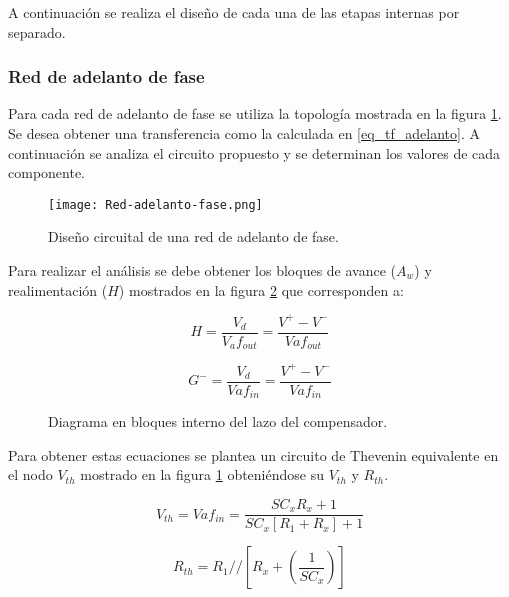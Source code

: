 A continuación se realiza el diseño de cada una de las etapas internas por separado.

\subsubsection{Red de adelanto de fase}

Para cada red de adelanto de fase se utiliza la topología mostrada en la figura \ref{fig:red-adelanto-fase}. Se desea obtener una transferencia como la calculada en \ref{eq_tf_adelanto}. A continuación se analiza el circuito propuesto y se determinan los valores de cada componente. 

\begin{figure}[H]
	\centering
	\texttt{[image: Red-adelanto-fase.png]}
	\caption{Diseño circuital de una red de adelanto de fase.}
	\label{fig:red-adelanto-fase}
\end{figure}

Para realizar el análisis se debe obtener los bloques de avance ($A_w$) y realimentación ($H$) mostrados en la figura \ref{fig:diag-diagrama_lazo_compensador} que corresponden a:


\begin{equation} 
	H = \frac{V_d}{V_af_{out}}=\frac{V^+ - V^-}{Vaf_{out}}
	\label{eq:h_del_compensador}
\end{equation} 

\begin{equation} 
	G^- = \frac{V_d}{Vaf_{in}}=\frac{V^+ - V^-}{Vaf_{in}}
	\label{eq:g_del_compensador}
\end{equation}

\begin{figure}[H]
	\centering
	
	\caption{Diagrama en bloques interno del lazo del compensador.}	
	\label{fig:diag-diagrama_lazo_compensador}
\end{figure}

Para obtener estas ecuaciones se plantea un circuito de Thevenin equivalente en el nodo $V_{th}$ mostrado en la figura \ref{fig:red-adelanto-fase} obteniéndose su $V_{th}$ y $R_{th}$.

\begin{equation} 
	V_{th} = Vaf_{in}= \frac{SC_xR_x+1}{SC_x[R_1+R_x]+1}
\end{equation}

\begin{equation} 
	R_{th} = R_1 //[R_x+(\frac{1}{SC_x})]
\end{equation}

